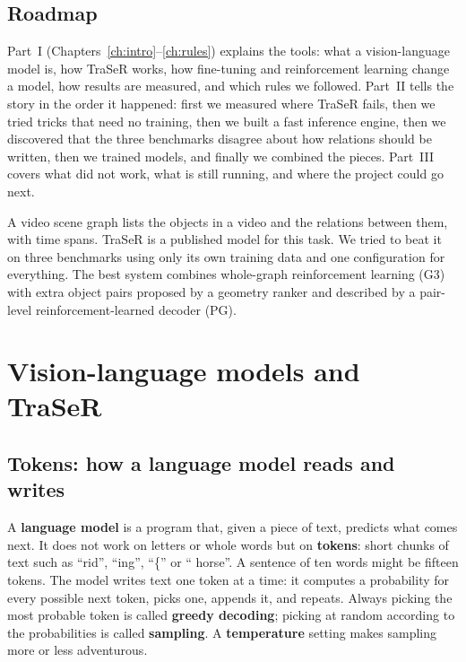 \documentclass[11pt,openany]{book}
\begin{document}
\section*{Roadmap}
Part~I (Chapters~\ref{ch:intro}--\ref{ch:rules}) explains the tools: what a vision-language model is, how TraSeR works, how
fine-tuning and reinforcement learning change a model, how results are measured, and which rules we followed. Part~II tells the
story in the order it happened: first we measured where TraSeR fails, then we tried tricks that need no training, then we built a
fast inference engine, then we discovered that the three benchmarks disagree about how relations should be written, then we
trained models, and finally we combined the pieces. Part~III covers what did not work, what is still running, and where the
project could go next.

\begin{summarybox}
A video scene graph lists the objects in a video and the relations between them, with time spans. TraSeR is a published model
for this task. We tried to beat it on three benchmarks using only its own training data and one configuration for everything.
The best system combines whole-graph reinforcement learning (G3) with extra object pairs proposed by a geometry ranker and
described by a pair-level reinforcement-learned decoder (PG).
\end{summarybox}

\chapter{Vision-language models and TraSeR}\label{ch:vlm}

\section{Tokens: how a language model reads and writes}
A \textbf{language model} is a program that, given a piece of text, predicts what comes next. It does not work on letters or
whole words but on \textbf{tokens}: short chunks of text such as ``rid'', ``ing'', ``\{'' or `` horse''. A sentence of ten words
might be fifteen tokens. The model writes text one token at a time: it computes a probability for every possible next token,
picks one, appends it, and repeats. Always picking the most probable token is called \textbf{greedy decoding}; picking at random
according to the probabilities is called \textbf{sampling}. A \textbf{temperature} setting makes sampling more or less adventurous.
\end{document}
